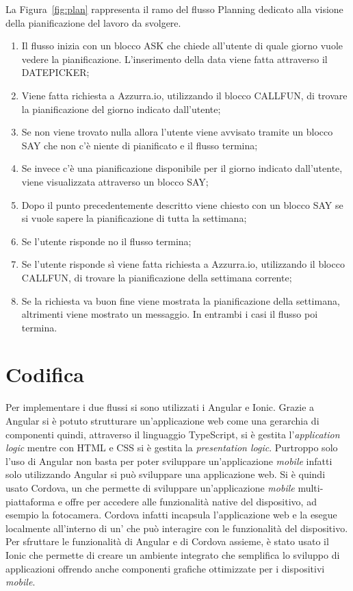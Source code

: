 La Figura~\ref{fig:plan} rappresenta il ramo del flusso Planning dedicato alla visione della pianificazione del lavoro da svolgere.
\begin{enumerate}
	\item Il flusso inizia con un blocco ASK che chiede all'utente di quale giorno vuole vedere la pianificazione. L'inserimento della data viene fatta attraverso il DATEPICKER;
	\item Viene fatta richiesta a Azzurra.io, utilizzando il blocco CALLFUN, di trovare la pianificazione del giorno indicato dall'utente;
	\item Se non viene trovato nulla allora l'utente viene avvisato tramite un blocco SAY che non c'è niente di pianificato e il flusso termina;
	\item Se invece c'è una pianificazione disponibile per il giorno indicato dall'utente, viene visualizzata attraverso un blocco SAY;
	\item Dopo il punto precedentemente descritto viene chiesto con un blocco SAY se si vuole sapere la pianificazione di tutta la settimana;
	\item Se l'utente risponde no il flusso termina;
	\item Se l'utente risponde sì viene fatta richiesta a Azzurra.io, utilizzando il blocco CALLFUN, di trovare la pianificazione della settimana corrente;
	\item Se la richiesta va buon fine viene mostrata la pianificazione della settimana, altrimenti viene mostrato un messaggio. In entrambi i casi il flusso poi termina.
\end{enumerate}
\clearpage

\section{Codifica}
Per implementare i due flussi si sono utilizzati i  Angular e Ionic. Grazie a Angular si è potuto strutturare un’applicazione web come una gerarchia di componenti quindi, attraverso il linguaggio TypeScript, si è gestita l'\emph{application logic} mentre con \gls{HTML} e \gls{CSS} si è gestita la \emph{presentation logic}. Purtroppo solo l'uso di Angular non basta per poter sviluppare un'applicazione \emph{mobile} infatti solo utilizzando Angular si può sviluppare una applicazione web. Si è quindi usato Cordova, un  che permette di sviluppare un'applicazione \emph{mobile} multi-piattaforma e offre  per accedere alle funzionalità native del dispositivo, ad esempio la fotocamera. Cordova infatti incapsula l'applicazione web e la esegue localmente all’interno di un’ che può interagire con le funzionalità del dispositivo. Per sfruttare le funzionalità di Angular e di Cordova assieme, è stato usato il  Ionic che permette di creare un ambiente integrato che semplifica lo sviluppo di applicazioni offrendo anche componenti grafiche ottimizzate per i dispositivi \emph{mobile}.\\

